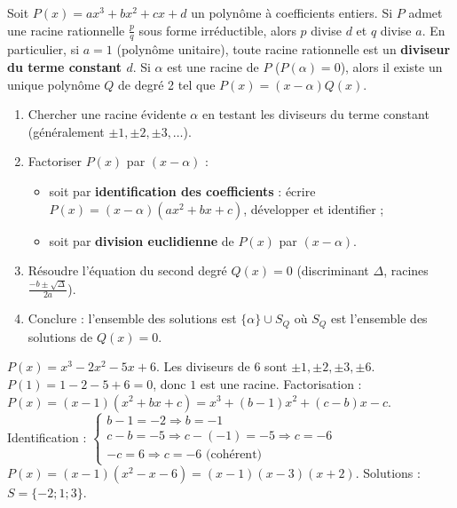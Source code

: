 \documentclass[11pt]{article}
\newcommand{\cle}[1]{{\popxbold\color{popdark}#1}}
\begin{document}
\begin{propriete}
Soit $P(x)=ax^3+bx^2+cx+d$ un polynôme à coefficients entiers. 
Si $P$ admet une racine rationnelle $\frac{p}{q}$ sous forme irréductible, alors $p$ divise $d$ et $q$ divise $a$. 
En particulier, si $a=1$ (polynôme unitaire), toute racine rationnelle est un \textbf{diviseur du terme constant $d$}.
Si $\alpha$ est une racine de $P$ ($P(\alpha)=0$), alors il existe un unique polynôme $Q$ de degré 2 tel que 
$P(x)=(x-\alpha)Q(x)$.
\end{propriete}

\begin{methode}[Résoudre une équation de degré 3 $P(x)=0$]
\begin{enumerate}
\item Chercher une \cle{racine évidente} $\alpha$ en testant les diviseurs du terme constant (généralement $\pm 1, \pm 2, \pm 3, \dots$).
\item Factoriser $P(x)$ par $(x-\alpha)$ :
\begin{itemize}
\item soit par \textbf{identification des coefficients} : écrire $P(x)=(x-\alpha)(ax^2+bx+c)$, développer et identifier ;
\item soit par \textbf{division euclidienne} de $P(x)$ par $(x-\alpha)$.
\end{itemize}
\item Résoudre l'équation du second degré $Q(x)=0$ (discriminant $\Delta$, racines $\frac{-b\pm\sqrt{\Delta}}{2a}$).
\item Conclure : l'ensemble des solutions est $\{\alpha\} \cup S_Q$ où $S_Q$ est l'ensemble des solutions de $Q(x)=0$.
\end{enumerate}
\end{methode}

\begin{exemplebox}[Résolution de $x^3-2x^2-5x+6=0$]
$P(x)=x^3-2x^2-5x+6$. Les diviseurs de $6$ sont $\pm 1, \pm 2, \pm 3, \pm 6$.
$P(1)=1-2-5+6=0$, donc $1$ est une racine.
Factorisation : $P(x)=(x-1)(x^2+bx+c)=x^3+(b-1)x^2+(c-b)x-c$.
Identification : 
$\begin{cases} b-1=-2 \Rightarrow b=-1 \\ c-b=-5 \Rightarrow c-(-1)=-5 \Rightarrow c=-6 \\ -c=6 \Rightarrow c=-6 \text{ (cohérent)} \end{cases}$
$P(x)=(x-1)(x^2-x-6)=(x-1)(x-3)(x+2)$.
Solutions : $S=\{-2; 1; 3\}$.
\end{exemplebox}
\end{document}
